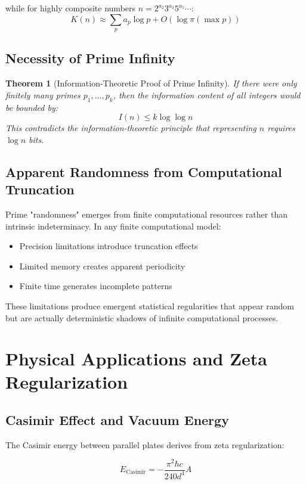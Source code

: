 \documentclass[12pt]{article}
\newtheorem{theorem}{Theorem}[section]
\begin{document}
while for highly composite numbers $n = 2^{a_2} 3^{a_3} 5^{a_5} \cdots$:
$$K(n) \approx \sum_p a_p \log p + O(\log \pi(\max p))$$

\subsection{Necessity of Prime Infinity}

\begin{theorem}[Information-Theoretic Proof of Prime Infinity]
If there were only finitely many primes $p_1, \ldots, p_k$, then the information content of all integers would be bounded by:
$$I(n) \leq k \log \log n$$
This contradicts the information-theoretic principle that representing $n$ requires $\log n$ bits.
\end{theorem}

\subsection{Apparent Randomness from Computational Truncation}

Prime "randomness" emerges from finite computational resources rather than intrinsic indeterminacy. In any finite computational model:

\begin{itemize}
\item Precision limitations introduce truncation effects
\item Limited memory creates apparent periodicity
\item Finite time generates incomplete patterns
\end{itemize}

These limitations produce emergent statistical regularities that appear random but are actually deterministic shadows of infinite computational processes.

\section{Physical Applications and Zeta Regularization}

\subsection{Casimir Effect and Vacuum Energy}

The Casimir energy between parallel plates derives from zeta regularization:

$$E_{\text{Casimir}} = -\frac{\pi^2 \hbar c}{240 d^4} A$$
\end{document}
